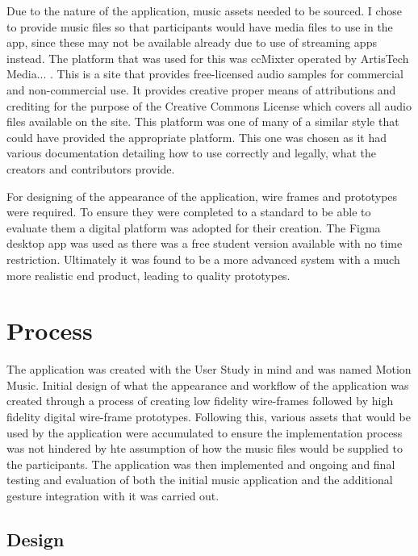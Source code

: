 \documentclass{l4proj}
\begin{document}
Due to the nature of the application, music assets needed to be sourced. I chose to provide music files so that participants would have media files to use in the app, since these may not be available already due to use of streaming apps instead. The platform that was used for this was ccMixter operated by ArtisTech Media... . This is a site that provides free-licensed audio samples for commercial and non-commercial use. It provides creative proper means of attributions and crediting for the purpose of the Creative Commons License which covers all audio files available on the site. This platform was one of many of a similar style that could have provided the appropriate platform. This one was chosen as it had various documentation detailing how to use correctly and legally, what the creators and contributors provide.

For designing of the appearance of the application, wire frames and prototypes were required. To ensure they were completed to a standard to be able to evaluate them a digital platform was adopted for their creation. The Figma desktop app was used as there was a free student version available with no time restriction. Ultimately it was found to be a more advanced system with a much more realistic end product, leading to quality prototypes.


\section{Process}

The application was created with the User Study in mind and was named Motion Music. Initial design of what the appearance and workflow of the application was created through a process of creating low fidelity wire-frames followed by high fidelity digital wire-frame prototypes. Following this, various assets that would be used by the application were accumulated to ensure the implementation process was not hindered by hte assumption of how the music files would be supplied to the participants. The application was then implemented and ongoing and final testing and evaluation of both the initial music application and the additional gesture integration with it was carried out.

\subsection{Design}
\end{document}
